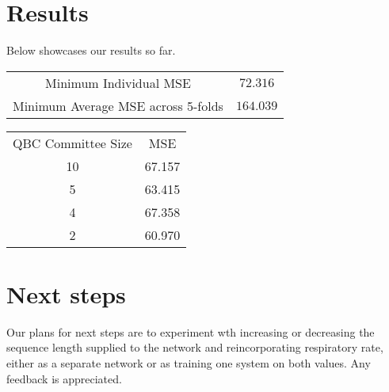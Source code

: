 \documentclass{article}
\begin{document}
\section*{Results}
Below showcases our results so far.
\begin{center}
    \begin{tabular}{c c}
        Minimum Individual MSE & $72.316$ \\ 
        Minimum Average MSE across 5-folds & $164.039$ \\
    \end{tabular}
\end{center}

\begin{center}
    \begin{tabular}{c c}
        QBC Committee Size & MSE \\ 
        10 & 67.157 \\
        5 & 63.415 \\
        4 & 67.358 \\
        2 & 60.970 \\
    \end{tabular}
\end{center}

\section*{Next steps}
Our plans for next steps are to experiment wth increasing or decreasing the sequence length supplied to the network and reincorporating respiratory rate, either as a separate network or as training one system on both values. Any feedback is appreciated.
\end{document}
